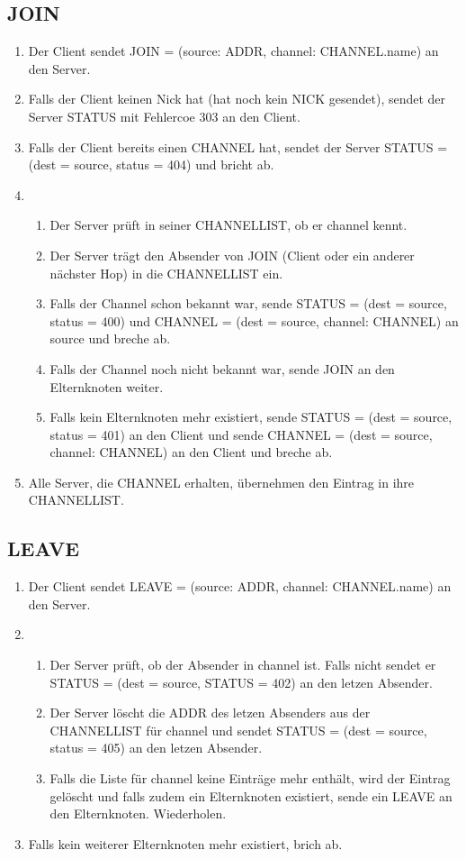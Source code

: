 \documentclass{article}
\begin{document}
\subsection{JOIN}

\begin{enumerate}
  \item Der Client sendet JOIN = (source: ADDR, channel: CHANNEL.name) an den Server.
  \item Falls der Client keinen Nick hat (hat noch kein NICK gesendet), sendet der Server STATUS mit Fehlercoe 303 an den Client.
  \item Falls der Client bereits einen CHANNEL hat, sendet der Server STATUS = (dest = source, status = 404) und bricht ab. 
  \item
    \begin{enumerate}
      \item Der Server prüft in seiner CHANNELLIST, ob er channel kennt.
      \item Der Server trägt den Absender von JOIN (Client oder ein anderer nächster Hop) in die CHANNELLIST ein.
      \item Falls der Channel schon bekannt war, sende STATUS = (dest = source, status = 400) und CHANNEL = (dest = source, channel: CHANNEL) an source und breche ab.
      \item Falls der Channel noch nicht bekannt war, sende JOIN an den Elternknoten weiter.
      \item Falls kein Elternknoten mehr existiert, sende STATUS = (dest = source, status = 401) an den Client und sende CHANNEL = (dest = source, channel: CHANNEL) an den Client und breche ab.
    \end{enumerate}
  \item Alle Server, die CHANNEL erhalten, übernehmen den Eintrag in ihre CHANNELLIST.
\end{enumerate}

\subsection{LEAVE}

\begin{enumerate}
  \item Der Client sendet LEAVE = (source: ADDR, channel: CHANNEL.name) an den Server.
  \item
    \begin{enumerate}
      \item Der Server prüft, ob der Absender in channel ist. Falls nicht sendet er STATUS = (dest = source, STATUS = 402) an den letzen Absender.
      \item Der Server löscht die ADDR des letzen Absenders aus der CHANNELLIST für channel und sendet STATUS = (dest = source, status = 405) an den letzen Absender.
      \item Falls die Liste für channel keine Einträge mehr enthält, wird der Eintrag gelöscht und falls zudem ein Elternknoten existiert, sende ein LEAVE an den Elternknoten. Wiederholen.
    \end{enumerate}
  \item Falls kein weiterer Elternknoten mehr existiert, brich ab.
\end{enumerate}
\end{document}
